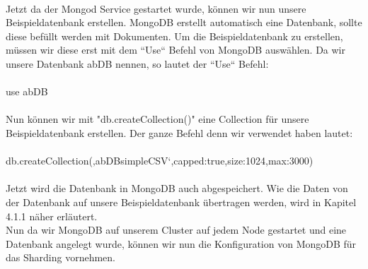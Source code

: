 \\
Jetzt da der Mongod Service gestartet wurde, k\"onnen wir nun unsere Beispieldatenbank erstellen. MongoDB erstellt automatisch eine Datenbank, sollte diese bef\"ullt werden mit Dokumenten. Um die Beispieldatenbank zu erstellen, m\"ussen wir diese erst mit dem “Use“ Befehl von MongoDB ausw\"ahlen. Da wir unsere Datenbank abDB nennen, so lautet der “Use“ Befehl:
\\
\\
use abDB
\\
\\
Nun k\"onnen wir mit "db.createCollection()" eine Collection f\"ur unsere Beispieldatenbank erstellen. Der ganze Befehl denn wir verwendet haben lautet:
\\
\\
db.createCollection(‚abDBsimpleCSV‘,{capped:true,size:1024,max:3000})
\\
\\
Jetzt wird die Datenbank in MongoDB auch abgespeichert. Wie die Daten von der Datenbank auf unsere Beispieldatenbank \"ubertragen werden, wird in Kapitel 4.1.1 n\"aher erl\"autert.
\\
Nun da wir MongoDB auf unserem Cluster auf jedem Node gestartet und eine Datenbank angelegt wurde, k\"onnen wir nun die Konfiguration von MongoDB f\"ur das Sharding vornehmen.\cite{mongo01}
